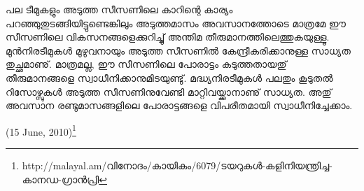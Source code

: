 പല ടീമുകളും അടുത്ത സീസണിലെ കാറിന്റെ കാര്യം പറഞ്ഞുതുടങ്ങിയിട്ടുണ്ടെങ്കിലും അടുത്തമാസം അവസാനത്തോടെ 
മാത്രമേ ഈ സീസണിലെ വികസനങ്ങളെക്കുറിച്ചു് അന്തിമ തീരുമാനത്തിലെത്തുകയുള്ളൂ. മുന്‍നിരടീമുകള്‍ മുഴുവനായും 
അടുത്ത സീസണില്‍ കേന്ദ്രീകരിക്കാനുള്ള സാധ്യത തുച്ഛമാണു്. മാത്രമല്ല, ഈ സീസണിലെ പോരാട്ടം കടുത്തതായതു് 
തീരുമാനങ്ങളെ സ്വാധീനിക്കാനുമിടയുണ്ടു്. മദ്ധ്യനിരടീമുകള്‍ പലതും കൂടുതല്‍ റിസോഴ്സുകള്‍ അടുത്ത സീസണിനുവേണ്ടി 
മാറ്റിവയ്ക്കാനാണു് സാധ്യത. അതു് അവസാന രണ്ടുമാസങ്ങളിലെ പോരാട്ടങ്ങളെ വിപരീതമായി സ്വാധീനിച്ചേക്കാം.

\hspace*{2em}(15 June, 2010)\footnote{http://malayal.am/വിനോദം/കായികം/6079/ടയറുകള്‍-കളിനിയന്ത്രിച്ച-കാനഡ-ഗ്രാന്‍പ്രി}

\newpage

